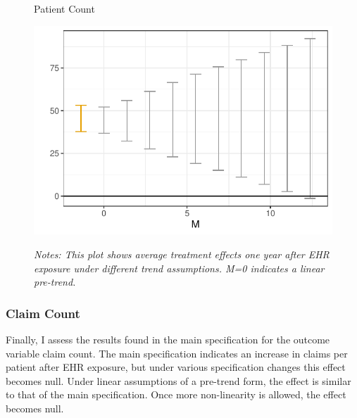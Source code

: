 \documentclass[12pt]{article}
\begin{document}
\begin{figure}[ht]
    \centering
    \captionsetup{width=.5\linewidth}
    \caption{Patient Count}
    \includegraphics[scale=.5]{Objects/patient_pretrends_plot.pdf}
    \label{fig:pre_patient}
    \vspace{2mm}
    \caption*{\footnotesize{\textit{Notes: This plot shows average treatment effects one year after EHR exposure under different trend assumptions. M=0 indicates a linear pre-trend.}}}
\end{figure}

\subsubsection{Claim Count}

Finally, I assess the results found in the main specification for the outcome variable claim count. The main specification indicates an increase in claims per patient after EHR exposure, but under various specification changes this effect becomes null. Under linear assumptions of a pre-trend form, the effect is similar to that of the main specification. Once more non-linearity is allowed, the effect becomes null. 
\end{document}
